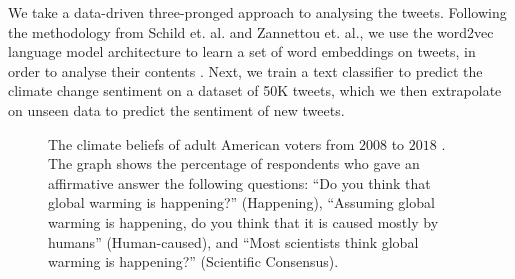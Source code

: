 \documentclass{paper}
\begin{document}
We take a data-driven three-pronged approach to analysing the tweets. Following the methodology from Schild et. al. and Zannettou et. al., we use the word2vec language model architecture to learn a set of word embeddings on tweets, in order to analyse their contents \cite{schild2020go, zannettou2019quantitative}. Next, we train a text classifier to predict the climate change sentiment on a dataset of 50K tweets, which we then extrapolate on unseen data to predict the sentiment of new tweets.


\begin{figure}[!hbp]
    \centering
    \caption{The climate beliefs of adult American voters from $2008$ to $2018$ \cite{https://doi.org/10.17605/osf.io/jw79p, Ballew2019}. The graph shows the percentage of respondents who gave an affirmative answer the following questions: ``Do you think that global warming is happening?'' (Happening), ``Assuming global warming is happening, do you think that it is caused mostly by humans'' (Human-caused), and ``Most scientists think global warming is happening?'' (Scientific Consensus).}
    \label{fig:climate_views_over_time}
\end{figure}
\end{document}
